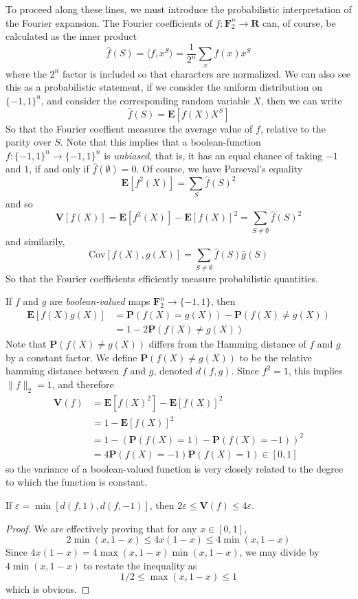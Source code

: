 To proceed along these lines, we must introduce the probabilistic interpretation of the Fourier expansion. The Fourier coefficients of $f: \mathbf{F}_2^n \to \mathbf{R}$ can, of course, be calculated as the inner product
%
\[ \widehat{f}(S) = \langle f, x^S \rangle = \frac{1}{2^n} \sum_x f(x) x^S \]
%
where the $2^n$ factor is included so that characters are normalized. We can also see this as a probabilistic statement, if we consider the uniform distribution on $\{ -1, 1 \}^n$, and consider the corresponding random variable $X$, then we can write
%
\[ \widehat{f}(S) = \mathbf{E}[f(X) X^S] \]
%
So that the Fourier coeffient measures the average value of $f$, relative to the parity over $S$. Note that this implies that a boolean-function $f: \{ -1, 1 \}^n \to \{ -1, 1 \}^n$ is {\it unbiased}, that is, it has an equal chance of taking $-1$ and $1$, if and only if $\widehat{f}(\emptyset) = 0$. Of course, we have Parseval's equality
%
\[ \mathbf{E}[f^2(X)] = \sum_S \widehat{f}(S)^2 \]
%
and so
%
\[ \mathbf{V}[f(X)] = \mathbf{E}[f^2(X)] - \mathbf{E}[f(X)]^2 = \sum_{S \neq \emptyset} \widehat{f}(S)^2 \]
%
and similarily,
%
\[ \text{Cov}[f(X),g(X)] = \sum_{S \neq \emptyset} \widehat{f}(S) \widehat{g}(S) \]
%
So that the Fourier coefficients efficiently measure probabilistic quantities.

If $f$ and $g$ are {\it boolean-valued} maps $\mathbf{F}_2^n \to \{ -1 , 1 \}$, then
%
\begin{align*}
    \mathbf{E}[f(X)g(X)] &= \mathbf{P}(f(X) = g(X)) - \mathbf{P}(f(X) \neq g(X))\\
    &= 1 - 2\mathbf{P}(f(X) \neq g(X))
\end{align*}
%
Note that $\mathbf{P}(f(X) \neq g(X))$ differs from the Hamming distance of $f$ and $g$ by a constant factor. We define $\mathbf{P}(f(X) \neq g(X))$ to be the relative hamming distance between $f$ and $g$, denoted $d(f,g)$. Since $f^2 = 1$, this implies $\| f \|_2 = 1$, and therefore
%
\begin{align*}
    \mathbf{V}(f) &= \mathbf{E}[f(X)^2] - \mathbf{E}[f(X)]^2\\
    &= 1 - \mathbf{E}[f(X)]^2\\
    &= 1 - (\mathbf{P}(f(X) = 1) - \mathbf{P}(f(X) = - 1))^2\\
    &= 4 \mathbf{P}(f(X) = -1) \mathbf{P}(f(X) = 1) \in [0,1]
\end{align*}
%
so the variance of a boolean-valued function is very closely related to the degree to which the function is constant.

\begin{lemma}
    If $\varepsilon = \min[d(f,1), d(f,-1)]$, then $2 \varepsilon \leq \mathbf{V}(f) \leq 4 \varepsilon$.
\end{lemma}
\begin{proof}
    We are effectively proving that for any $x \in [0,1]$,
    \[ 2\min(x,1-x) \leq 4x(1-x) \leq 4\min(x,1-x) \]
    Since $4x(1-x) = 4\max(x,1-x)\min(x,1-x)$, we may divide by $4 \min(x,1-x)$ to restate the inequality as
    \[ 1/2 \leq \max(x,1-x) \leq 1 \]
    which is obvious.
\end{proof}

